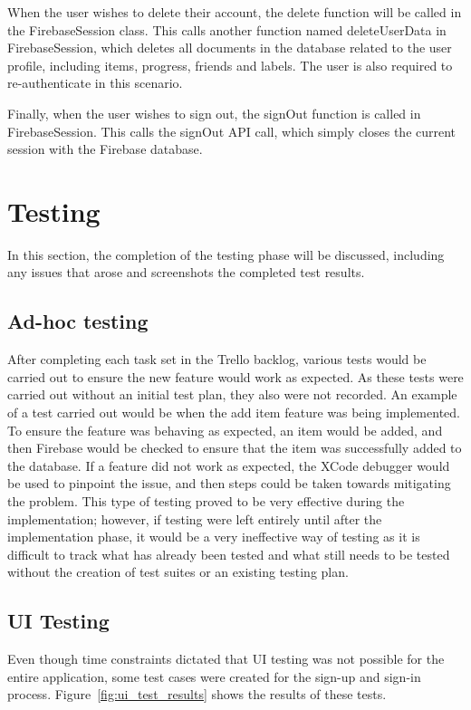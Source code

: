         When the user wishes to delete their account, the delete function will be called in the FirebaseSession class.  This calls another function named deleteUserData in FirebaseSession, which deletes all documents in the database related to the user profile, including items, progress, friends and labels.  The user is also required to re-authenticate in this scenario.
        
        Finally, when the user wishes to sign out, the signOut function is called in FirebaseSession. This calls the signOut API call, which simply closes the current session with the Firebase database.
        
    \section{Testing}
    \label{sec:deliverables_testing}
    In this section, the completion of the testing phase will be discussed, including any issues that arose and screenshots the completed test results.
    
    \subsection{Ad-hoc testing}
    After completing each task set in the Trello backlog, various tests would be carried out to ensure the new feature would work as expected.  As these tests were carried out without an initial test plan, they also were not recorded.  An example of a test carried out would be when the add item feature was being implemented.  To ensure the feature was behaving as expected, an item would be added, and then Firebase would be checked to ensure that the item was successfully added to the database.  If a feature did not work as expected, the XCode debugger would be used to pinpoint the issue, and then steps could be taken towards mitigating the problem.  This type of testing proved to be very effective during the implementation; however, if testing were left entirely until after the implementation phase, it would be a very ineffective way of testing as it is difficult to track what has already been tested and what still needs to be tested without the creation of test suites or an existing testing plan.
    
    \subsection{UI Testing}
    Even though time constraints dictated that UI testing was not possible for the entire application, some test cases were created for the sign-up and sign-in process.  Figure~\ref{fig:ui_test_results} shows the results of these tests.
    
